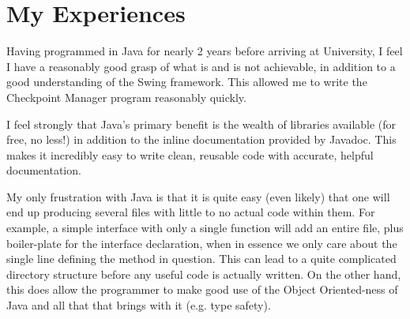 \documentclass[a4paper, twoside]{article}
\begin{document}
\section{My Experiences}
Having programmed in Java for nearly 2 years before arriving at University, I
feel I have a reasonably good grasp of what is and is not achievable, in
addition to a good understanding of the Swing framework. This allowed me to
write the Checkpoint Manager program reasonably quickly.

I feel strongly that Java's primary benefit is the wealth of libraries available
(for free, no less!) in addition to the inline documentation provided by
Javadoc. This makes it incredibly easy to write clean, reusable code with
accurate, helpful documentation.

My only frustration with Java is that it is quite easy (even likely) that one
will end up producing several files with little to no actual code within them.
For example, a simple interface with only a single function will add an entire
file, plus boiler-plate for the interface declaration, when in essence we only
care about the single line defining the method in question. This can lead to
a quite complicated directory structure before any useful code is actually
written. On the other hand, this does allow the programmer to make good use of
the Object Oriented-ness of Java and all that that brings with it (e.g. type
safety).
\end{document}
